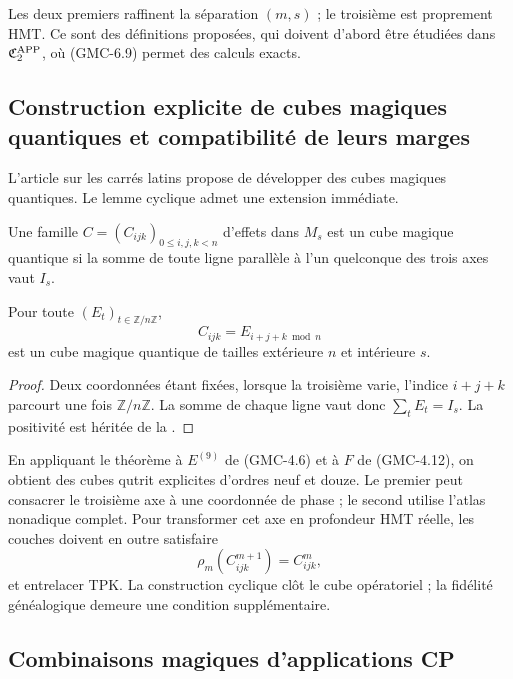 Les deux premiers raffinent la séparation $(m,s)$ ; le troisième est proprement
HMT. Ce sont des définitions proposées, qui doivent d'abord être étudiées dans
$\mathfrak C_2^{\rm APP}$, où \textup{(GMC-6.9)} permet des calculs exacts.

\subsection{Construction explicite de cubes magiques quantiques et compatibilité de leurs marges}

L'article sur les carrés latins propose de développer des cubes magiques quantiques.
Le lemme cyclique admet une extension immédiate.

\begin{definition}
Une famille
$C=(C_{ijk})_{0\le i,j,k<n}$ d'effets dans $M_s$ est un cube magique quantique
si la somme de toute ligne parallèle à l'un quelconque des trois axes vaut $I_s$.
\end{definition}

\begin{theorem}
\label{p12-83-c22-s5:gmc:thm:cubo-ciclico}
Pour toute \POVM $(E_t)_{t\in\mathbb Z/n\mathbb Z}$,
\[
 C_{ijk}=E_{i+j+k\bmod n}
 \tag{GMC-8.2}
\]
est un cube magique quantique de tailles extérieure $n$ et intérieure $s$.
\end{theorem}

\begin{proof}
Deux coordonnées étant fixées, lorsque la troisième varie, l'indice
$i+j+k$ parcourt une fois $\mathbb Z/n\mathbb Z$. La somme de chaque ligne vaut donc
$\sum_tE_t=I_s$. La positivité est héritée de la \POVM.
\end{proof}

En appliquant le théorème à $E^{(9)}$ de \textup{(GMC-4.6)} et à $F$ de
\textup{(GMC-4.12)}, on obtient des cubes qutrit explicites d'ordres neuf et douze. Le
premier peut consacrer le troisième axe à une coordonnée de phase ; le second utilise
l'atlas nonadique complet. Pour transformer cet axe en profondeur HMT réelle,
les couches doivent en outre satisfaire
\[
 \rho_m(C^{m+1}_{ijk})=C^m_{ijk},
 \tag{GMC-8.3}
\]
et entrelacer TPK. La construction cyclique clôt le cube opératoriel ; la
fidélité généalogique demeure une condition supplémentaire.

\subsection{Combinaisons magiques d'applications CP}

